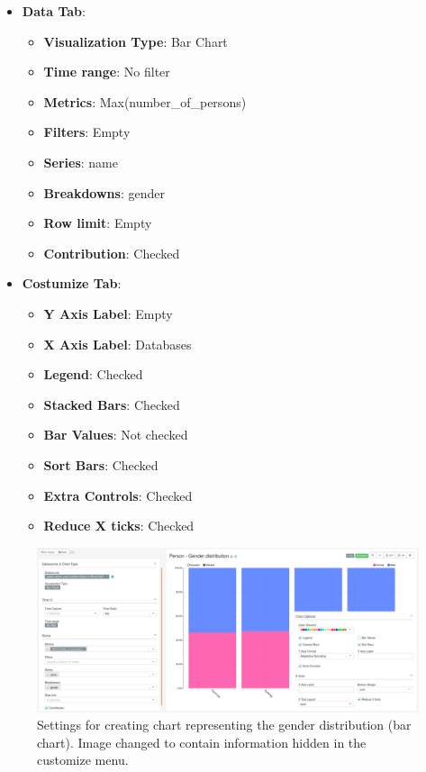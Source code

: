 \documentclass[]{book}
\providecommand{\tightlist}{%
  \setlength{\itemsep}{0pt}\setlength{\parskip}{0pt}}
\begin{document}
\begin{itemize}
\tightlist
\item
  \textbf{Data Tab}:

  \begin{itemize}
  \tightlist
  \item
    \textbf{Visualization Type}: Bar Chart
  \item
    \textbf{Time range}: No filter
  \item
    \textbf{Metrics}: Max(number\_of\_persons)
  \item
    \textbf{Filters}: Empty
  \item
    \textbf{Series}: name
  \item
    \textbf{Breakdowns}: gender
  \item
    \textbf{Row limit}: Empty
  \item
    \textbf{Contribution}: Checked
  \end{itemize}
\item
  \textbf{Costumize Tab}:

  \begin{itemize}
  \tightlist
  \item
    \textbf{Y Axis Label}: Empty
  \item
    \textbf{X Axis Label}: Databases
  \item
    \textbf{Legend}: Checked
  \item
    \textbf{Stacked Bars}: Checked
  \item
    \textbf{Bar Values}: Not checked
  \item
    \textbf{Sort Bars}: Checked
  \item
    \textbf{Extra Controls}: Checked
  \item
    \textbf{Reduce X ticks}: Checked
  \end{itemize}
\end{itemize}

\begin{figure}
\includegraphics[width=1\linewidth]{images/personGenderDistribution} \caption{Settings for creating chart representing the gender distribution (bar chart). Image changed to contain information hidden in the customize menu.}\label{fig:personGenderDistribution}
\end{figure}
\end{document}
